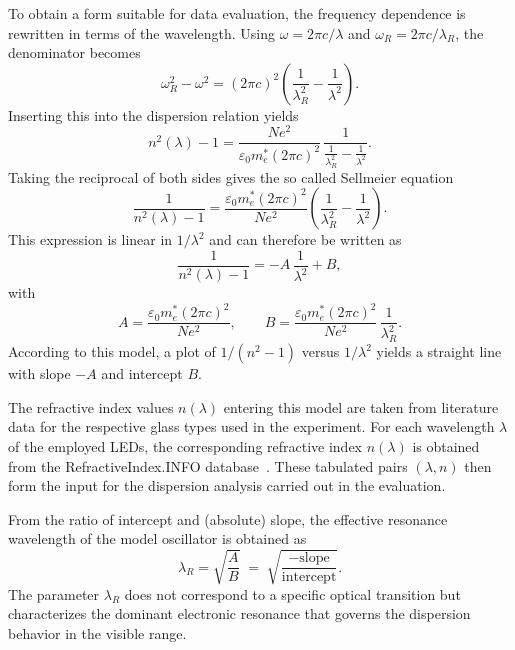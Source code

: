 \documentclass[a4paper]{article}
\begin{document}
To obtain a form suitable for data evaluation, the frequency dependence is rewritten in terms of the wavelength.
Using $\omega = 2\pi c/\lambda$ and $\omega_R = 2\pi c/\lambda_R$, the denominator becomes
\[
  \omega_R^2 - \omega^2 = (2\pi c)^2\left(\frac{1}{\lambda_R^2} - \frac{1}{\lambda^2}\right).
\]
Inserting this into the dispersion relation yields
\[
  n^2(\lambda) - 1 = \frac{N e^2}{\varepsilon_0 m_e^* (2\pi c)^2}\,\frac{1}{\frac{1}{\lambda_R^2} - \frac{1}{\lambda^2}}.
\]
Taking the reciprocal of both sides gives the so called Sellmeier equation~\cite{FARAnleitung}
\begin{equation}
  \frac{1}{n^2(\lambda) - 1} = \frac{\varepsilon_0 m_e^* (2\pi c)^2}{N e^2}
  \left(\frac{1}{\lambda_R^2} - \frac{1}{\lambda^2}\right).
  \label{eq:sellmeier}
\end{equation}
This expression is linear in $1/\lambda^2$ and can therefore be written as
\begin{equation}
  \frac{1}{n^2(\lambda) - 1} = -A\,\frac{1}{\lambda^2} + B,
  \label{eq:sellmeier_linear}
\end{equation}
with
\begin{equation}
  A = \frac{\varepsilon_0 m_e^* (2\pi c)^2}{N e^2},
  \qquad
  B = \frac{\varepsilon_0 m_e^* (2\pi c)^2}{N e^2}\,\frac{1}{\lambda_R^2}.
\end{equation}
According to this model, a plot of $1/(n^2-1)$ versus $1/\lambda^2$ yields a straight line with slope $-A$ and intercept $B$.

The refractive index values $n(\lambda)$ entering this model are taken from literature data for the respective glass types used in the experiment.
For each wavelength $\lambda$ of the employed LEDs, the corresponding refractive index $n(\lambda)$ is obtained from the RefractiveIndex.INFO database~\cite{refractiveindexinfo}.
These tabulated pairs $(\lambda,n)$ then form the input for the dispersion analysis carried out in the evaluation.

From the ratio of intercept and (absolute) slope, the effective resonance wavelength of the model oscillator is obtained as
\begin{equation}
  \lambda_R = \sqrt{\frac{A}{B}} \;=\; \sqrt{\frac{-\text{slope}}{\text{intercept}}}.
  \label{eq:lambda_r_from_fit}
\end{equation}
The parameter $\lambda_R$ does not correspond to a specific optical transition but characterizes the dominant electronic resonance that governs the dispersion behavior in the visible range.
\end{document}
